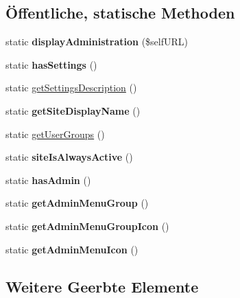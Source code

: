 \subsection*{Öffentliche, statische Methoden}
\begin{DoxyCompactItemize}
\item 
\mbox{\label{classadministrationusers_acc6654166c2a168187441526820ac756}} 
static {\bfseries display\+Administration} (\$self\+U\+RL)
\item 
\mbox{\label{classadministrationusers_a676cb26f91f765f9c85ec020d17e4ab8}} 
static {\bfseries has\+Settings} ()
\item 
static \mbox{\hyperlink{classadministrationusers_ab6c2258f5a6ec98200295848ca510a5c}{get\+Settings\+Description}} ()
\item 
\mbox{\label{classadministrationusers_af6c49f61efadf6786e3c9f075b36a869}} 
static {\bfseries get\+Site\+Display\+Name} ()
\item 
static \mbox{\hyperlink{classadministrationusers_ad37fa65a3d9e456fb2f6bb9b489c55f8}{get\+User\+Groups}} ()
\item 
\mbox{\label{classadministrationusers_acb9d77afaa9cb808845db830662a79d4}} 
static {\bfseries site\+Is\+Always\+Active} ()
\item 
\mbox{\label{classadministrationusers_a3e72247c3b56f6b8072712f7bd2a9bf1}} 
static {\bfseries has\+Admin} ()
\item 
\mbox{\label{classadministrationusers_a8e5fae83127902a117b474fd842b4771}} 
static {\bfseries get\+Admin\+Menu\+Group} ()
\item 
\mbox{\label{classadministrationusers_a047e2f3f94d793d7e43669aff3c012c7}} 
static {\bfseries get\+Admin\+Menu\+Group\+Icon} ()
\item 
\mbox{\label{classadministrationusers_acda4f822e9f8136726a0da07227c8754}} 
static {\bfseries get\+Admin\+Menu\+Icon} ()
\end{DoxyCompactItemize}
\subsection*{Weitere Geerbte Elemente}


